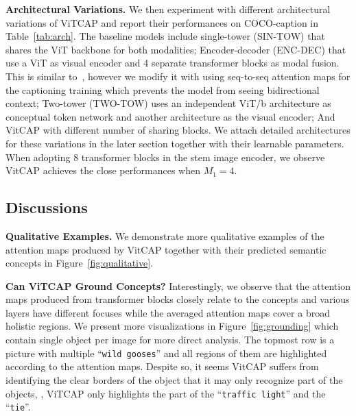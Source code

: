 \vspace{1mm}
\noindent \textbf{Architectural Variations.} We then experiment
with different architectural variations of ViTCAP and report their performances on COCO-caption in Table~\ref{tab:arch}. 
The baseline models include single-tower (SIN-TOW) that shares the ViT backbone for both modalities; Encoder-decoder (ENC-DEC) that use a ViT as visual encoder and 4 separate transformer blocks as modal fusion. This is similar to~\citep{kim2021vilt}, however we modify it with using seq-to-seq attention maps for the captioning training which prevents the model from seeing bidirectional context; Two-tower (TWO-TOW) uses an independent ViT/b architecture as conceptual token network and another architecture as the visual encoder; And VitCAP with different number of sharing blocks. We attach detailed architectures for these variations in the later section together with their learnable parameters. When adopting $8$ transformer blocks in the stem image encoder, we observe VitCAP achieves the close performances when $M_1=4$.



\vspace{1mm}




\subsection{Discussions}
\noindent\textbf{Qualitative Examples.}
We demonstrate more qualitative examples of the attention maps produced by VitCAP together with their predicted semantic concepts in Figure~\ref{fig:qualitative}. 

\vspace{1mm}
\noindent\textbf{Can ViTCAP Ground Concepts?} Interestingly, we observe that the attention maps produced from transformer blocks closely relate to the concepts and various layers have different focuses while the averaged attention maps cover a broad holistic regions. We present more visualizations in Figure~\ref{fig:grounding} which contain single object per image for more direct analysis. The topmost row is a picture with multiple ``\texttt{wild gooses}'' and all regions of them are highlighted according to the attention maps. Despite so, it seems VitCAP suffers from identifying the clear borders of the object that it may only recognize part of the objects, \eg, ViTCAP only highlights the part of the ``\texttt{traffic light}'' and the ``\texttt{tie}''.

